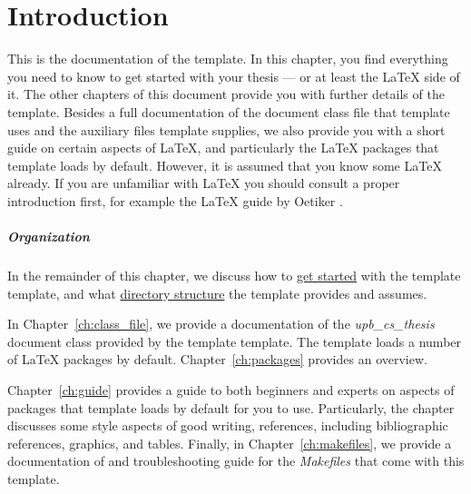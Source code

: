 \chapter{Introduction}
\label{ch:introduction}

This is the documentation of the \ac{template}.
In this chapter, you find everything you need to know to get started with your
thesis --- or at least the \LaTeX{} side of it. 
The other chapters of this document provide you with further details of the
template.
Besides a full documentation of the document class file that \ac{template}
uses and the auxiliary files \ac{template} supplies, we also provide you with
a short guide on certain aspects of \LaTeX{}, and particularly the \LaTeX{}
packages that \ac{template} loads by default.
However, it is assumed that you know some \LaTeX{} already.
If you are unfamiliar with \LaTeX{} you should consult a proper introduction
first, for example the \LaTeX{} guide by Oetiker \etal{} \cite{LatexGuide}.


\paragraph{Organization}
In the remainder of this chapter, we discuss how to
\hyperref[sec:introduction:start]{get started} with the \ac{template} template,
and what \hyperref[sec:introduction:folders]{directory structure} the template
provides and assumes.

In Chapter~\ref{ch:class_file}, we provide a documentation of the
\emph{upb\_cs\_thesis} document class provided by the \ac{template} template.
The template loads a number of \LaTeX{} packages by default.
Chapter~\ref{ch:packages} provides an overview.

Chapter~\ref{ch:guide} provides a guide to both beginners and experts on
aspects of packages that \ac{template} loads by default for you to use.
Particularly, the chapter discusses some style aspects of good writing,
references, including bibliographic references, graphics, and tables.
Finally, in Chapter~\ref{ch:makefiles}, we provide a documentation of and
troubleshooting guide for the \emph{Makefiles} that come with this template.




